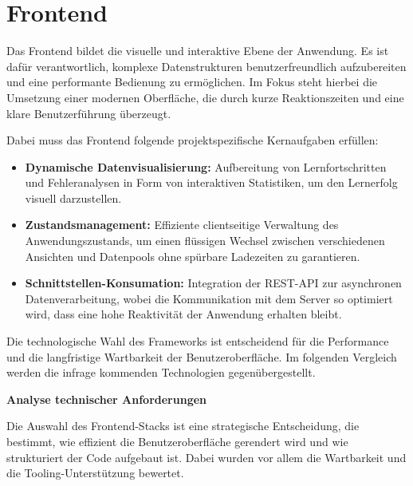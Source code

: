 
\section{Frontend}
\setauthor{\secondauthor}

Das Frontend bildet die visuelle und interaktive Ebene der Anwendung. Es ist dafür verantwortlich, komplexe Datenstrukturen benutzerfreundlich aufzubereiten und eine performante Bedienung zu ermöglichen. Im Fokus steht hierbei die Umsetzung einer modernen Oberfläche, die durch kurze Reaktionszeiten und eine klare Benutzerführung überzeugt.

Dabei muss das Frontend folgende projektspezifische Kernaufgaben erfüllen:
\begin{itemize}
\item \textbf{Dynamische Datenvisualisierung:} Aufbereitung von Lernfortschritten und Fehleranalysen in Form von interaktiven Statistiken, um den Lernerfolg visuell darzustellen.
\item \textbf{Zustandsmanagement:} Effiziente clientseitige Verwaltung des Anwendungszustands, um einen flüssigen Wechsel zwischen verschiedenen Ansichten und Datenpools ohne spürbare Ladezeiten zu garantieren.
\item \textbf{Schnittstellen-Konsumation:} Integration der REST-API zur asynchronen Datenverarbeitung, wobei die Kommunikation mit dem Server so optimiert wird, dass eine hohe Reaktivität der Anwendung erhalten bleibt.
\end{itemize}

Die technologische Wahl des Frameworks ist entscheidend für die Performance und die langfristige Wartbarkeit der Benutzeroberfläche. Im folgenden Vergleich werden die infrage kommenden Technologien gegenübergestellt.

\vspace{1cm}
\textbf{Analyse technischer Anforderungen}
\setauthor{\secondauthor}

Die Auswahl des Frontend-Stacks ist eine strategische Entscheidung, die bestimmt, wie effizient die Benutzeroberfläche gerendert wird und wie strukturiert der Code aufgebaut ist. Dabei wurden vor allem die Wartbarkeit und die Tooling-Unterstützung bewertet.

